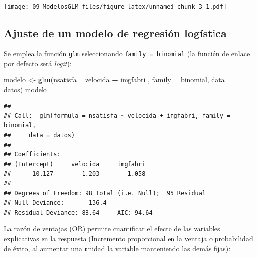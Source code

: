 \documentclass[]{book}
\newenvironment{Shaded}{\begin{snugshade}}{\end{snugshade}}
\newcommand{\KeywordTok}[1]{\textcolor[rgb]{0.13,0.29,0.53}{\textbf{#1}}}
\newcommand{\DataTypeTok}[1]{\textcolor[rgb]{0.13,0.29,0.53}{#1}}
\newcommand{\DecValTok}[1]{\textcolor[rgb]{0.00,0.00,0.81}{#1}}
\newcommand{\StringTok}[1]{\textcolor[rgb]{0.31,0.60,0.02}{#1}}
\newcommand{\OperatorTok}[1]{\textcolor[rgb]{0.81,0.36,0.00}{\textbf{#1}}}
\newcommand{\NormalTok}[1]{#1}
\begin{document}
\begin{Shaded}
\end{Shaded}

\texttt{[image: 09-ModelosGLM\_files/figure-latex/unnamed-chunk-3-1.pdf]}

\subsection{Ajuste de un modelo de regresión
logística}\label{ajuste-de-un-modelo-de-regresion-logistica}

Se emplea la función \texttt{glm} seleccionando
\texttt{family\ =\ binomial} (la función de enlace por defecto será
\emph{logit}):

\begin{Shaded}
\begin{Highlighting}[]
\NormalTok{modelo <-}\StringTok{ }\KeywordTok{glm}\NormalTok{(nsatisfa }\OperatorTok{~}\StringTok{ }\NormalTok{velocida }\OperatorTok{+}\StringTok{ }\NormalTok{imgfabri , }\DataTypeTok{family =}\NormalTok{ binomial, }\DataTypeTok{data =}\NormalTok{ datos)}
\NormalTok{modelo}
\end{Highlighting}
\end{Shaded}

\begin{verbatim}
## 
## Call:  glm(formula = nsatisfa ~ velocida + imgfabri, family = binomial, 
##     data = datos)
## 
## Coefficients:
## (Intercept)     velocida     imgfabri  
##     -10.127        1.203        1.058  
## 
## Degrees of Freedom: 98 Total (i.e. Null);  96 Residual
## Null Deviance:       136.4 
## Residual Deviance: 88.64     AIC: 94.64
\end{verbatim}

La razón de ventajas (OR) permite cuantificar el efecto de las variables
explicativas en la respuesta (Incremento proporcional en la ventaja o
probabilidad de éxito, al aumentar una unidad la variable manteniendo
las demás fijas):
\end{document}
